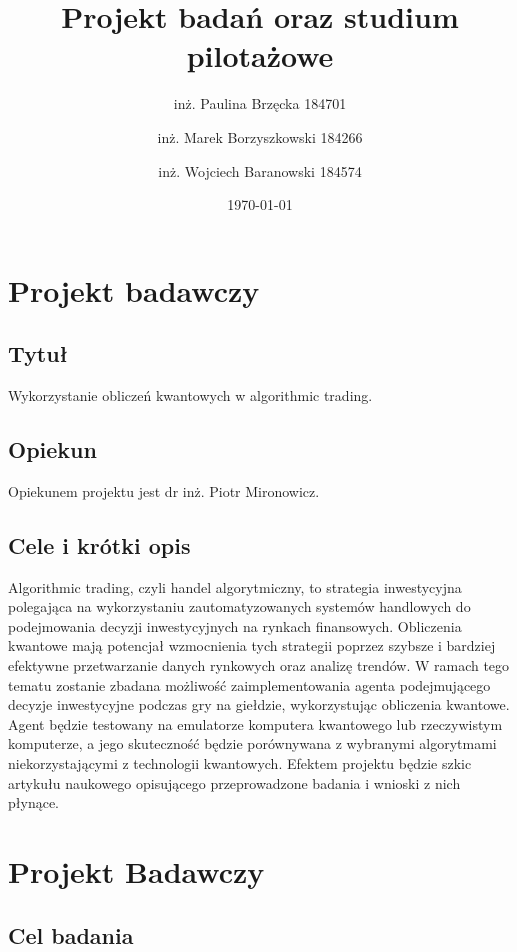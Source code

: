 \documentclass[polish,envcountsect,10pt]{article}
\title{Projekt badań oraz studium pilotażowe}
\author{inż. Paulina Brzęcka 184701 \and inż. Marek Borzyszkowski 184266 \and inż. Wojciech Baranowski 184574}
\date{\today}
\begin{document}
\maketitle
\tableofcontents
\newpage

\section{Projekt badawczy}

\subsection{Tytuł}

Wykorzystanie obliczeń kwantowych w algorithmic trading.

\subsection{Opiekun}

Opiekunem projektu jest dr inż. Piotr Mironowicz.

\subsection{Cele i krótki opis}

Algorithmic trading, czyli handel algorytmiczny, to strategia inwestycyjna polegająca na wykorzystaniu zautomatyzowanych systemów handlowych do podejmowania decyzji inwestycyjnych na rynkach finansowych. Obliczenia kwantowe mają potencjał wzmocnienia tych strategii poprzez szybsze i bardziej efektywne przetwarzanie danych rynkowych oraz analizę trendów. W ramach tego tematu zostanie zbadana możliwość zaimplementowania agenta podejmującego decyzje inwestycyjne podczas gry na giełdzie, wykorzystując obliczenia kwantowe. Agent będzie testowany na emulatorze komputera kwantowego lub rzeczywistym komputerze, a jego skuteczność będzie porównywana z wybranymi algorytmami niekorzystającymi z technologii kwantowych. Efektem projektu będzie szkic artykułu naukowego opisującego przeprowadzone badania i wnioski z nich płynące.


\section{Projekt Badawczy}

\subsection{Cel badania}
\end{document}
